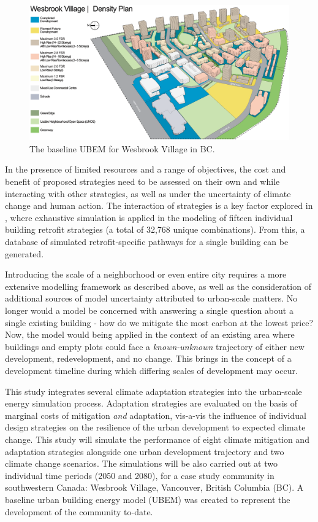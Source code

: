 \documentclass[twocolumn, a4paper,10pt]{article}
\begin{document}
\begin{figure}[hbpt]
    \centering
    \includegraphics[scale=0.28]{figures/wesbrook_plan.eps}
    \caption{The baseline UBEM for Wesbrook Village in BC.}
    \label{fig:wesbrook_base}
\end{figure}

In the presence of limited resources and a range of objectives, the cost and benefit of proposed strategies need to be assessed on their own and while interacting with other strategies, as well as under the uncertainty of climate change and human action. The interaction of strategies is a key factor explored in \citet{rysanek_using_2013}, where exhaustive simulation is applied in the modeling of fifteen individual building retrofit strategies (a total of 32,768 unique combinations). From this, a database of simulated retrofit-specific pathways for a single building can be generated.

Introducing the scale of a neighborhood or even entire city requires a more extensive modelling framework as described above, as well as the consideration of additional sources of model uncertainty attributed to urban-scale matters. No longer would a model be concerned with answering a single question about a single existing building - how do we mitigate the most carbon at the lowest price? Now, the model would  being applied in the context of an existing area where buildings and empty plots could face a \textit{known-unknown} trajectory of either new development, redevelopment, and no change. This brings in the concept of a development timeline during which differing scales of development may occur.

This study integrates several climate adaptation strategies into the urban-scale energy simulation process. Adaptation strategies are evaluated on the basis of marginal costs of mitigation \textit{and} adaptation, vis-a-vis the influence of individual design strategies on the resilience of the urban development to expected climate change. This study will simulate the performance of eight climate mitigation and adaptation strategies alongside one urban development trajectory and two climate change scenarios. The simulations will be also carried out at two individual time periods (2050 and 2080), for a case study community in southwestern Canada: Wesbrook Village, Vancouver, British Columbia (BC). A baseline urban building energy model (UBEM) was created to represent the development of the community to-date.
\end{document}
